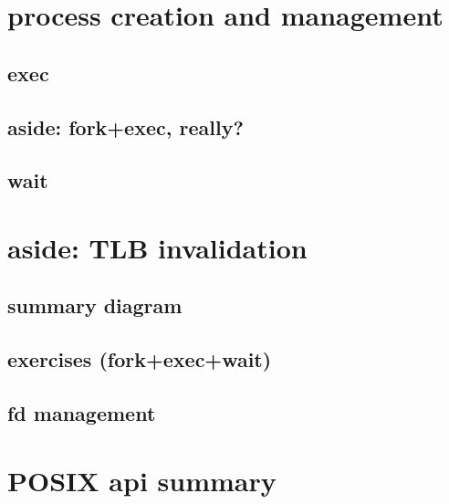 
\section{process creation and management}












\subsection{exec}






\subsection{aside: fork+exec, really?}



\subsection{wait}




\section{aside: TLB invalidation}


\subsection{summary diagram}




\subsection{exercises (fork+exec+wait)}



\subsection{fd management}



\section{POSIX api summary}

